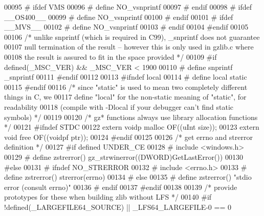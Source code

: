 \begin{DoxyCode}
00095 \textcolor{preprocessor}{#  ifdef VMS}
00096 \textcolor{preprocessor}{#    define NO\_vsnprintf}
00097 \textcolor{preprocessor}{#  endif}
00098 \textcolor{preprocessor}{#  ifdef \_\_OS400\_\_}
00099 \textcolor{preprocessor}{#    define NO\_vsnprintf}
00100 \textcolor{preprocessor}{#  endif}
00101 \textcolor{preprocessor}{#  ifdef \_\_MVS\_\_}
00102 \textcolor{preprocessor}{#    define NO\_vsnprintf}
00103 \textcolor{preprocessor}{#  endif}
00104 \textcolor{preprocessor}{#endif}
00105 
00106 \textcolor{comment}{/* unlike snprintf (which is required in C99), \_snprintf does not guarantee}
00107 \textcolor{comment}{   null termination of the result -- however this is only used in gzlib.c where}
00108 \textcolor{comment}{   the result is assured to fit in the space provided */}
00109 \textcolor{preprocessor}{#if defined(\_MSC\_VER) && \_MSC\_VER < 1900}
00110 \textcolor{preprocessor}{#  define snprintf \_snprintf}
00111 \textcolor{preprocessor}{#endif}
00112 
00113 \textcolor{preprocessor}{#ifndef local}
00114 \textcolor{preprocessor}{#  define local static}
00115 \textcolor{preprocessor}{#endif}
00116 \textcolor{comment}{/* since "static" is used to mean two completely different things in C, we}
00117 \textcolor{comment}{   define "local" for the non-static meaning of "static", for readability}
00118 \textcolor{comment}{   (compile with -Dlocal if your debugger can't find static symbols) */}
00119 
00120 \textcolor{comment}{/* gz* functions always use library allocation functions */}
00121 \textcolor{preprocessor}{#ifndef STDC}
00122   \textcolor{keyword}{extern} voidp  malloc OF((uInt size));
00123   \textcolor{keyword}{extern} \textcolor{keywordtype}{void}   free   OF((voidpf ptr));
00124 \textcolor{preprocessor}{#endif}
00125 
00126 \textcolor{comment}{/* get errno and strerror definition */}
00127 \textcolor{preprocessor}{#if defined UNDER\_CE}
00128 \textcolor{preprocessor}{#  include <windows.h>}
00129 \textcolor{preprocessor}{#  define zstrerror() gz\_strwinerror((DWORD)GetLastError())}
00130 \textcolor{preprocessor}{#else}
00131 \textcolor{preprocessor}{#  ifndef NO\_STRERROR}
00132 \textcolor{preprocessor}{#    include <errno.h>}
00133 \textcolor{preprocessor}{#    define zstrerror() strerror(errno)}
00134 \textcolor{preprocessor}{#  else}
00135 \textcolor{preprocessor}{#    define zstrerror() "stdio error (consult errno)"}
00136 \textcolor{preprocessor}{#  endif}
00137 \textcolor{preprocessor}{#endif}
00138 
00139 \textcolor{comment}{/* provide prototypes for these when building zlib without LFS */}
00140 \textcolor{preprocessor}{#if !defined(\_LARGEFILE64\_SOURCE) || \_LFS64\_LARGEFILE-0 == 0}

\end{DoxyCode}
